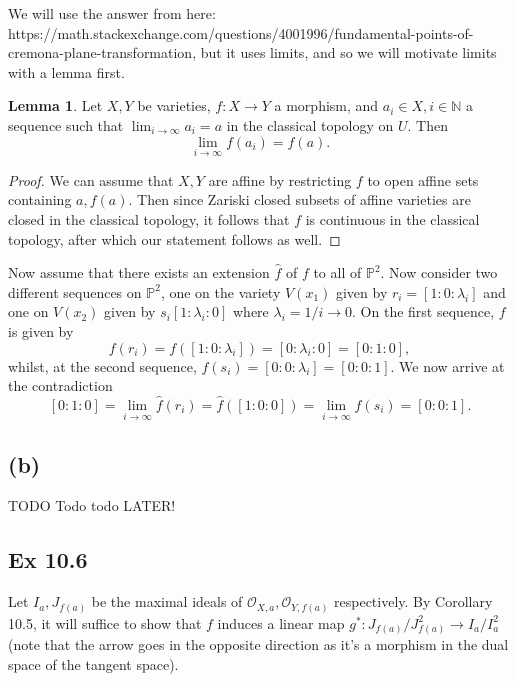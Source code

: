 \documentclass{article}
\theoremstyle{definition}
\newtheorem{lemma}[theorem]{Lemma}
\renewcommand{\P}{\mathbb{P}}
\newcommand{\N}{\mathbb{N}}
\newcommand{\PP}[1]{\P^{#1}}
\begin{document}
We will use the answer from here: https://math.stackexchange.com/questions/4001996/fundamental-points-of-cremona-plane-transformation, but it uses limits, and so we will motivate limits 
with a lemma first. 

\begin{lemma}
	Let $X, Y$ be varieties, $f : X \to Y$ a morphism, and $a_i \in X, i \in
	\N$ a sequence such that $\lim_{i \to \infty} a_i = a$ in the classical
	topology on $U$. Then
	\[
		\lim_{i \to \infty} f(a_i) = f(a).
	\]
\end{lemma}
\begin{proof}
	We can assume that $X, Y$ are affine by restricting $f$ to open affine sets
	containing $a, f(a)$. Then since Zariski closed subsets of affine varieties
	are closed in the classical topology, it follows that $f$ is continuous in
	the classical topology, after which our statement follows as well.
\end{proof}

Now assume that there exists an extension $\hat{f}$ of $f$ to all of $\PP{2}$.
Now consider two different sequences on $\PP{2}$, one on the
variety $V(x_1)$ given by $r_i = [1 : 0 : \lambda_i]$ and one on
$V(x_2)$ given by $s_i [1 : \lambda_i : 0]$ where $\lambda_i = 1/i \to 0$.
On the first sequence, $f$ is given by
\[
	f(r_i)
	=
	f([1 : 0 : \lambda_i]) 
	= 
	[0 : \lambda_i : 0]
	=
	[0 : 1 : 0],
\]
whilst, at the second sequence, $f(s_i) = [0 : 0 : \lambda_i] = [0 : 0 : 1]$.
We now arrive at the contradiction
\[
	[0 : 1 : 0]
	=
	\lim_{i \to \infty}
	\hat{f}(r_i)
	=
	\hat{f}([1 : 0 : 0])
	=
	\lim_{i \to \infty}
	\hat{f}(s_i)
	=
	[0 : 0 : 1].
\] 


\subsection*{(b)}

TODO Todo todo
LATER!

\subsection*{Ex 10.6}

Let $I_a, J_{f(a)}$ be the maximal ideals of $\mathcal{O}_{X, a},
\mathcal{O}_{Y, f(a)}$ respectively. By Corollary 10.5, it will suffice to show
that $f$ induces a linear map $g^* :  J_{f(a)} / J_{f(a)}^{2} \to I_a/I_a^{2}$
(note that the arrow goes in the opposite direction as it's a morphism in the
dual space of the tangent space). \\
\end{document}
